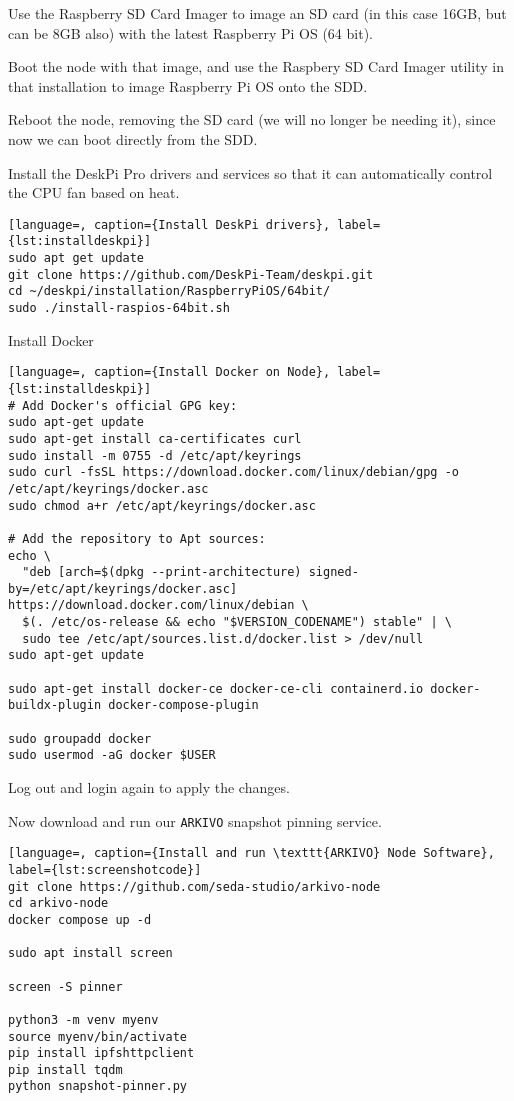 Use the Raspberry SD Card Imager to image an SD card (in this case 16GB, but can be 8GB also) with the latest Raspberry Pi OS (64 bit).

Boot the node with that image, and use the Raspbery SD Card Imager utility in that installation to image Raspberry Pi OS onto the SDD.

Reboot the node, removing the SD card (we will no longer be needing it), since now we can boot directly from the SDD.

Install the DeskPi Pro drivers and services so that it can automatically control the CPU fan based on heat.


\begin{lstlisting}[language=, caption={Install DeskPi drivers}, label={lst:installdeskpi}] 
sudo apt get update
git clone https://github.com/DeskPi-Team/deskpi.git 
cd ~/deskpi/installation/RaspberryPiOS/64bit/
sudo ./install-raspios-64bit.sh 
\end{lstlisting}


Install Docker

\begin{lstlisting}[language=, caption={Install Docker on Node}, label={lst:installdeskpi}] 
# Add Docker's official GPG key:
sudo apt-get update
sudo apt-get install ca-certificates curl
sudo install -m 0755 -d /etc/apt/keyrings
sudo curl -fsSL https://download.docker.com/linux/debian/gpg -o /etc/apt/keyrings/docker.asc
sudo chmod a+r /etc/apt/keyrings/docker.asc

# Add the repository to Apt sources:
echo \
  "deb [arch=$(dpkg --print-architecture) signed-by=/etc/apt/keyrings/docker.asc] https://download.docker.com/linux/debian \
  $(. /etc/os-release && echo "$VERSION_CODENAME") stable" | \
  sudo tee /etc/apt/sources.list.d/docker.list > /dev/null
sudo apt-get update

sudo apt-get install docker-ce docker-ce-cli containerd.io docker-buildx-plugin docker-compose-plugin

sudo groupadd docker
sudo usermod -aG docker $USER
\end{lstlisting}

Log out and login again to apply the changes.

Now download and run our \texttt{ARKIVO} snapshot pinning service.

\begin{lstlisting}[language=, caption={Install and run \texttt{ARKIVO} Node Software}, label={lst:screenshotcode}] 
git clone https://github.com/seda-studio/arkivo-node
cd arkivo-node
docker compose up -d

sudo apt install screen

screen -S pinner

python3 -m venv myenv
source myenv/bin/activate
pip install ipfshttpclient
pip install tqdm
python snapshot-pinner.py
\end{lstlisting}

